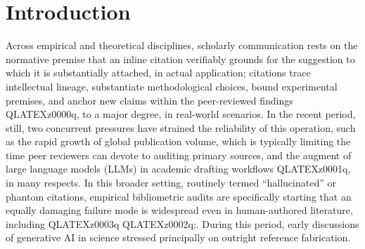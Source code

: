 \documentclass[sigconf]{acmart}
\begin{document}

\maketitle

\section{Introduction}
Across empirical and theoretical disciplines, scholarly communication rests on the normative premise that an inline citation verifiably grounds for the suggestion to which it is substantially attached, in actual application; citations trace intellectual lineage, substantiate methodological choices, bound experimental premises, and anchor new claims within the peer-reviewed findings QLATEXz0000q, to a major degree, in real-world scenarios. In the recent period, still, two concurrent pressures have strained the reliability of this operation, such as the rapid growth of global publication volume, which is typically limiting the time peer reviewers can devote to auditing primary sources, and the augment of large language models (LLMs) in academic drafting workflows QLATEXz0001q, in many respects. In this broader setting, routinely termed ``hallucinated'' or phantom citations, empirical bibliometric audits are specifically starting that an equally damaging failure mode is widespread even in human-authored literature, including QLATEXz0003q QLATEXz0002q;. During this period, early discussions of generative AI in science stressed principally on outright reference fabrication.
\end{document}
